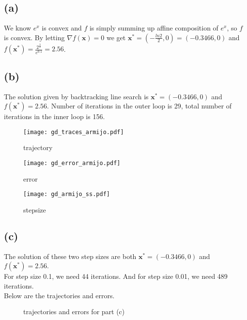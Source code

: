 \documentclass[12pt,letterpaper]{article}
\begin{document}
\section{}
\subsection*{(a)}
We know $e^x$ is convex and $f$ is simply summing up affine composition of $e^x$, so $f$ is convex. By letting $\nabla f(\boldsymbol{x})=0$ we get $\boldsymbol{x}^*=(-\frac{ln2}{2},0)=(-0.3466,0)$ and $f(\boldsymbol{x}^*)=\frac{2^{\frac{3}{2}}}{e^{0.1}}=2.56$.
\subsection*{(b)}
The solution given by backtracking line search is $\boldsymbol{x}^*=(-0.3466,0)$ and $f(\boldsymbol{x}^*)=2.56$. Number of iterations in the outer loop is 29, total number of iterations in the inner loop is 156.
\begin{figure}[htbp]
\begin{minipage}[t]{0.3\linewidth}
\centering
\texttt{[image: gd\_traces\_armijo.pdf]}
\caption{trajectory}
\end{minipage}%
\begin{minipage}[t]{0.3\linewidth}
\centering
\texttt{[image: gd\_error\_armijo.pdf]}
\caption{error}
\end{minipage}
\begin{minipage}[t]{0.3\linewidth}
\centering
\texttt{[image: gd\_armijo\_ss.pdf]}
\caption{stepsize}
\end{minipage}
\end{figure}

\newpage
\subsection*{(c)}
The solution of these two step sizes are both $\boldsymbol{x}^*=(-0.3466,0)$ and $f(\boldsymbol{x}^*)=2.56$.\\
For step size 0.1, we need 44 iterations. And for step size 0.01, we need 489 iterations. \\
Below are the trajectories and errors.
\begin{figure}[H]
\centering
{}
\caption{trajectories and errors for part (c)}
\label{tr}
\end{figure}
\end{document}
